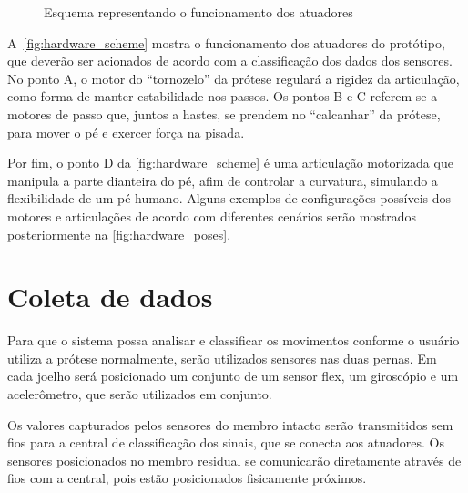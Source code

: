 \begin{figure}[ht]
	\caption{\label{fig:hardware_scheme}Esquema representando o funcionamento dos atuadores}
	\begin{center}
	\end{center}
\end{figure}

A~\autoref{fig:hardware_scheme} mostra o funcionamento dos atuadores do protótipo, que deverão ser acionados de acordo com a classificação dos dados dos sensores. No ponto A, o motor do ``tornozelo'' da prótese regulará a rigidez da articulação, como forma de manter estabilidade nos passos. Os pontos B e C referem-se a motores de passo que, juntos a hastes, se prendem no ``calcanhar'' da prótese, para mover o pé e exercer força na pisada.

Por fim, o ponto D da \autoref{fig:hardware_scheme} é uma articulação motorizada que manipula a parte dianteira do pé, afim de controlar a curvatura, simulando a flexibilidade de um pé humano. Alguns exemplos de configurações possíveis dos motores e articulações de acordo com diferentes cenários serão mostrados posteriormente na \autoref{fig:hardware_poses}.

\section{Coleta de dados}\label{sec:metodo_coleta}
Para que o sistema possa analisar e classificar os movimentos conforme o usuário utiliza a prótese normalmente, serão utilizados sensores nas duas pernas. Em cada joelho será posicionado um conjunto de um sensor flex, um giroscópio e um acelerômetro, que serão utilizados em conjunto.

Os valores capturados pelos sensores do membro intacto serão transmitidos sem fios para a central de classificação dos sinais, que se conecta aos atuadores. Os sensores posicionados no membro residual se comunicarão diretamente através de fios com a central, pois estão posicionados fisicamente próximos.

